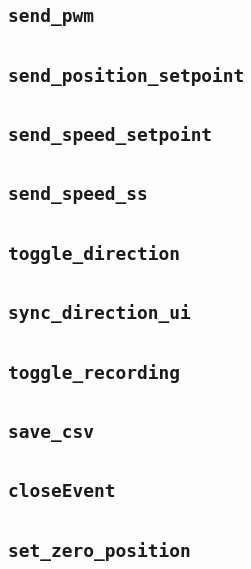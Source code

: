 \subsection{\texttt{send\_pwm}}
\subsection{\texttt{send\_position\_setpoint}}
\subsection{\texttt{send\_speed\_setpoint}}
\subsection{\texttt{send\_speed\_ss}}
\subsection{\texttt{toggle\_direction}}
\subsection{\texttt{sync\_direction\_ui}}
\subsection{\texttt{toggle\_recording}}
\subsection{\texttt{save\_csv}}
\subsection{\texttt{closeEvent}}
\subsection{\texttt{set\_zero\_position}}

